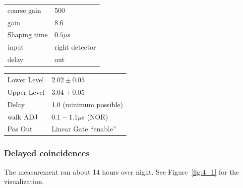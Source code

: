 \begin{minipage}{\textwidth}
  \begin{minipage}[b]{0.49\textwidth}
   \begin{tabular}{|l|l|}
       \hline
       coarse gain  & 500 \\
       gain         & 8.6 \\
       Shaping time & $0.5\mu$s \\
       input        & right detector \\ 
       delay        & out \\
       \hline
   \end{tabular}

  \end{minipage}
  \hfill
  \begin{minipage}[b]{0.49\textwidth}
    \centering
   \begin{tabular}{|l|l|}
       \hline
       Lower Level  & $2.02\pm0.05$ \\
       Upper Level  & $3.04\pm0.05$ \\
       Delay        & 1.0 (minimum possible) \\
       walk ADJ     & $0.1 - 1.1\mu$s (NOR)  \\
       Pos Out      & Linear Gate ``enable''\\
       \hline
   \end{tabular}
\end{minipage}
\end{minipage}
\clearpage
\subsubsection{Delayed coincidences}
The measurement ran about 14 hours over night. See Figure~\ref{fig:4_1} for the visualization.
\label{ssub:Conduction of the experiment over night}

